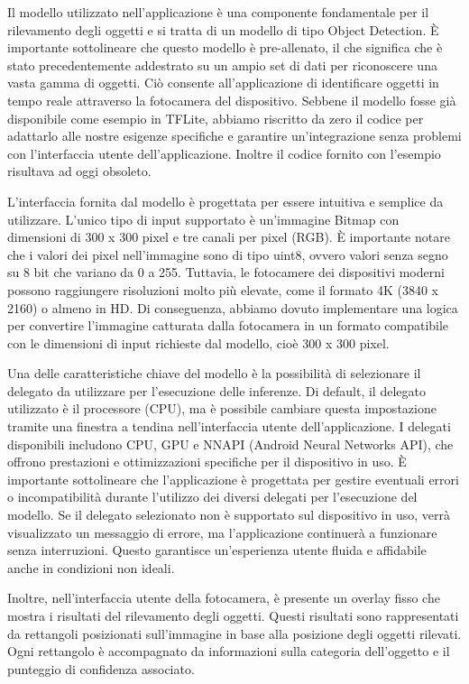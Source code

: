 Il modello utilizzato nell'applicazione è una componente fondamentale per il rilevamento degli oggetti e si tratta di un modello di tipo Object Detection.
È importante sottolineare che questo modello è pre-allenato, il che significa che è stato precedentemente addestrato su un ampio set di dati per riconoscere
una vasta gamma di oggetti. Ciò consente all'applicazione di identificare oggetti in tempo reale attraverso la fotocamera del dispositivo.
Sebbene il modello fosse già disponibile come esempio in TFLite, abbiamo riscritto da zero il codice per adattarlo alle nostre esigenze specifiche e
garantire un'integrazione senza problemi con l'interfaccia utente dell'applicazione. Inoltre il codice fornito con l’esempio risultava ad oggi obsoleto.

L'interfaccia fornita dal modello è progettata per essere intuitiva e semplice da utilizzare. L'unico tipo di input supportato è un'immagine Bitmap con
dimensioni di 300 x 300 pixel e tre canali per pixel (RGB). È importante notare che i valori dei pixel nell'immagine sono di tipo uint8, ovvero valori
senza segno su 8 bit che variano da 0 a 255.
Tuttavia, le fotocamere dei dispositivi moderni possono raggiungere risoluzioni molto più elevate, come il formato 4K (3840 x 2160) o almeno in HD. Di
conseguenza, abbiamo dovuto implementare una logica per convertire l'immagine catturata dalla fotocamera in un formato compatibile con le dimensioni di
input richieste dal modello, cioè 300 x 300 pixel.

Una delle caratteristiche chiave del modello è la possibilità di selezionare il delegato da utilizzare per l'esecuzione delle inferenze. Di default, il
delegato utilizzato è il processore (CPU), ma è possibile cambiare questa impostazione tramite una finestra a tendina nell'interfaccia utente
dell'applicazione. I delegati disponibili includono CPU, GPU e NNAPI (Android Neural Networks API), che offrono prestazioni e ottimizzazioni specifiche
per il dispositivo in uso.
È importante sottolineare che l'applicazione è progettata per gestire eventuali errori o incompatibilità durante l'utilizzo dei diversi delegati per
l'esecuzione del modello. Se il delegato selezionato non è supportato sul dispositivo in uso, verrà visualizzato un messaggio di errore, ma l'applicazione
continuerà a funzionare senza interruzioni. Questo garantisce un'esperienza utente fluida e affidabile anche in condizioni non ideali.

Inoltre, nell'interfaccia utente della fotocamera, è presente un overlay fisso che mostra i risultati del rilevamento degli oggetti. Questi risultati sono
rappresentati da rettangoli posizionati sull'immagine in base alla posizione degli oggetti rilevati. Ogni rettangolo è accompagnato da informazioni sulla
categoria dell'oggetto e il punteggio di confidenza associato.

